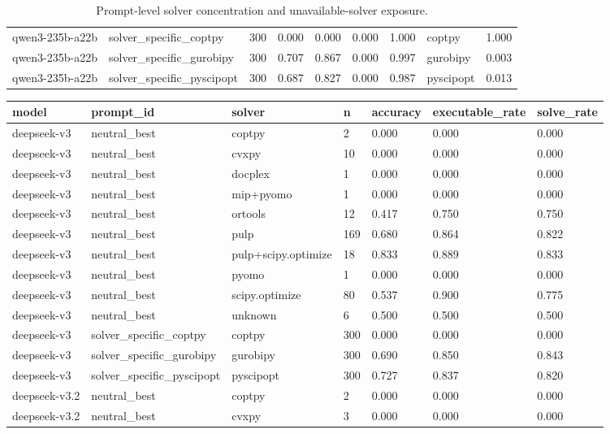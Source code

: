 \begin{table}[t]
\begin{tabular}{lllllllll}
qwen3-235b-a22b & solver\_specific\_coptpy & 300 & 0.000 & 0.000 & 0.000 & 1.000 & coptpy & 1.000 \\
qwen3-235b-a22b & solver\_specific\_gurobipy & 300 & 0.707 & 0.867 & 0.000 & 0.997 & gurobipy & 0.003 \\
qwen3-235b-a22b & solver\_specific\_pyscipopt & 300 & 0.687 & 0.827 & 0.000 & 0.987 & pyscipopt & 0.013 \\
\bottomrule
\end{tabular}
\caption{Prompt-level solver concentration and unavailable-solver exposure.}
\label{tab:or_eval_prompt_bias}
\end{table}

\begin{table}[t]
\centering
\small
\begin{tabular}{lllllll}
\toprule
model & prompt\_id & solver & n & accuracy & executable\_rate & solve\_rate \\
\midrule
deepseek-v3 & neutral\_best & coptpy & 2 & 0.000 & 0.000 & 0.000 \\
deepseek-v3 & neutral\_best & cvxpy & 10 & 0.000 & 0.000 & 0.000 \\
deepseek-v3 & neutral\_best & docplex & 1 & 0.000 & 0.000 & 0.000 \\
deepseek-v3 & neutral\_best & mip+pyomo & 1 & 0.000 & 0.000 & 0.000 \\
deepseek-v3 & neutral\_best & ortools & 12 & 0.417 & 0.750 & 0.750 \\
deepseek-v3 & neutral\_best & pulp & 169 & 0.680 & 0.864 & 0.822 \\
deepseek-v3 & neutral\_best & pulp+scipy.optimize & 18 & 0.833 & 0.889 & 0.833 \\
deepseek-v3 & neutral\_best & pyomo & 1 & 0.000 & 0.000 & 0.000 \\
deepseek-v3 & neutral\_best & scipy.optimize & 80 & 0.537 & 0.900 & 0.775 \\
deepseek-v3 & neutral\_best & unknown & 6 & 0.500 & 0.500 & 0.500 \\
deepseek-v3 & solver\_specific\_coptpy & coptpy & 300 & 0.000 & 0.000 & 0.000 \\
deepseek-v3 & solver\_specific\_gurobipy & gurobipy & 300 & 0.690 & 0.850 & 0.843 \\
deepseek-v3 & solver\_specific\_pyscipopt & pyscipopt & 300 & 0.727 & 0.837 & 0.820 \\
deepseek-v3.2 & neutral\_best & coptpy & 2 & 0.000 & 0.000 & 0.000 \\
deepseek-v3.2 & neutral\_best & cvxpy & 3 & 0.000 & 0.000 & 0.000 \\

\end{tabular}
\end{table}

